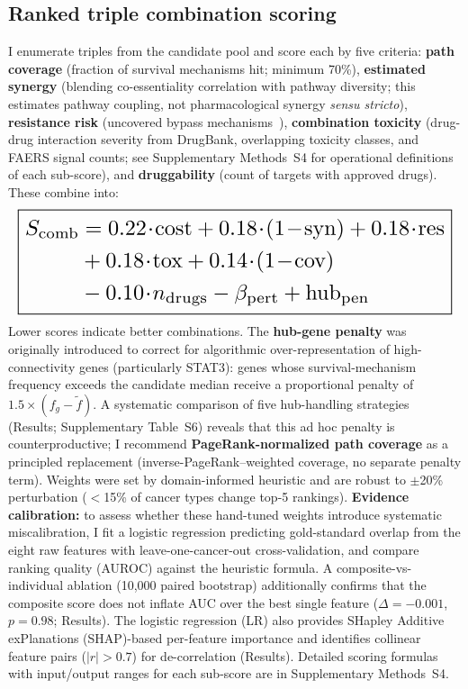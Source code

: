 \documentclass[11pt]{article}
\begin{document}
\subsection*{Ranked triple combination scoring}
I enumerate triples from the candidate pool and score each by five criteria: \textbf{path coverage} (fraction of survival mechanisms hit; minimum 70\%), \textbf{estimated synergy} (blending co-essentiality correlation with pathway diversity; this estimates pathway coupling, not pharmacological synergy \textit{sensu stricto}), \textbf{resistance risk} (uncovered bypass mechanisms~\cite{Bergholz2021}), \textbf{combination toxicity} (drug-drug interaction severity from DrugBank, overlapping toxicity classes, and FAERS signal counts; see Supplementary Methods~S4 for operational definitions of each sub-score), and \textbf{druggability} (count of targets with approved drugs). These combine into:
\begin{equation}
\resizebox{\columnwidth}{!}{$\displaystyle
\boxed{\begin{aligned}
S_{\text{comb}} &= 0.22\!\cdot\!\text{cost} + 0.18\!\cdot\!(1\!-\!\text{syn}) + 0.18\!\cdot\!\text{res} \\
&+ 0.18\!\cdot\!\text{tox} + 0.14\!\cdot\!(1\!-\!\text{cov}) \\
&- 0.10\!\cdot\!n_{\text{drugs}} - \beta_{\text{pert}} + \text{hub}_{\text{pen}}
\end{aligned}}
$}
\end{equation}
Lower scores indicate better combinations. The \textbf{hub-gene penalty} was originally introduced to correct for algorithmic over-representation of high-connectivity genes (particularly STAT3): genes whose survival-mechanism frequency exceeds the candidate median receive a proportional penalty of $1.5 \times (f_g - \tilde{f})$. A systematic comparison of five hub-handling strategies (Results; Supplementary Table~S6) reveals that this ad hoc penalty is counterproductive; I recommend \textbf{PageRank-normalized path coverage} as a principled replacement (inverse-PageRank--weighted coverage, no separate penalty term). Weights were set by domain-informed heuristic and are robust to $\pm$20\% perturbation ($<$15\% of cancer types change top-5 rankings). \textbf{Evidence calibration:} to assess whether these hand-tuned weights introduce systematic miscalibration, I fit a logistic regression predicting gold-standard overlap from the eight raw features with leave-one-cancer-out cross-validation, and compare ranking quality (AUROC) against the heuristic formula. A composite-vs-individual ablation (10{,}000 paired bootstrap) additionally confirms that the composite score does not inflate AUC over the best single feature ($\Delta = -0.001$, $p = 0.98$; Results). The logistic regression (LR) also provides SHapley Additive exPlanations (SHAP)-based per-feature importance and identifies collinear feature pairs ($|r| > 0.7$) for de-correlation (Results). Detailed scoring formulas with input/output ranges for each sub-score are in Supplementary Methods~S4.
\end{document}
